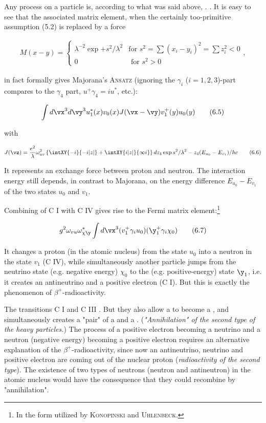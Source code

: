 \documentclass{article}
\newcommand{\nequ}[2]{
\begin{align*}
#1
\tag{#2}
\end{align*}
}
\begin{document}
Any process on a particle is, according to what was said above, . . It is easy to see that the associated matrix element, when the certainly too-primitive assumption (5.2) is replaced by a force
\nequ{
M(x-y) = \begin{cases}
 \lambda^{-2}\exp{+s^2/\lambda^2} & \text{for } s^2 = \sum{(x_i-y_i)^2} = \sum z_i^2 < 0\\
 0 & \text{ for } s^2 > 0
  \end{cases},
}{6.4}
in fact formally gives Majorana's \textsc{Ansatz} (ignoring the $\gamma_i$ ($i=1,2,3$)-part compares to the $\gamma_4$ part, $u^+\gamma_4 = iu^*$, etc.):
\nequ{
\int{d\vx}^3{d\vy}^3 u_1^*(x) v_0(x) J(\vx - \vy)v_1^+(y)u_0(y)
}{6.5}
with
\nequ{
J(\vz) = \frac{e^2}{\lambda}\omega_{uv}^2\left\{\intXY{-i}{-i|z|} + \intXY{i|z|}{\infty i}\right\}
{dz_4}\exp{s^2/\lambda^2 - z_4(E_{u_0} - E_{v_1})/hc}
}{6.6}
It represents an exchange force between proton and neutron. The interaction energy still depends, in contrast to Majorana, on the energy difference $E_{u_0} - E_{v_1}$ of the two states $u_0$ and $v_1$.

Combining of C I with C IV gives rise to the Fermi matrix element:\footnote{In the form utilized by \textsc{Konopinski} and \textsc{Uhlenbeck}\cite{13}.}
\nequ{
g^2 \omega_{vu}\omega^*_{\chi\y} \int{d\vx}^3
  (v_1^+ \gamma_i u_0)(\y_1^+ \gamma_i \chi_0)
}{6.7}
It changes a proton (in the atomic nucleus) from the state $u_0$ into a neutron in the state $v_1$ (C IV), while simultaneously another particle jumps from the neutrino state (e.g. negative energy) $\chi_0$ to the (e.g. positive-energy) state $\y_1$, i.e. it creates an antineutrino and a positive electron (C I). But this is exactly the phenomenon of $\beta^+$-radioactivity.

The transitions C I and C III . But they also allow a  to become a , and simultaneously creates a "pair" of a  and a . (\textit{"Annihilation" of the second type of the heavy particles.}) The process of a positive electron becoming a neutrino and a neutron (negative energy) becoming a positive electron requires an alternative explanation of the $\beta^+$-radioactivity, since now an antineutrino, neutrino and positive electron are coming out of the nuclear proton (\textit{radioactivity of the second type}). The existence of two types of neutrons (neutron and antineutron) in the atomic nucleus would have the consequence that they could recombine by "annihilation".
\end{document}
